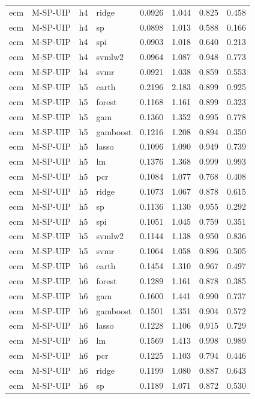 \begin{ThreePartTable}
\begin{longtable}[t]{llclcccc}
ecm & M-SP-UIP & h4 & ridge & 0.0926 & 1.044 & 0.825 & 0.458\\
ecm & M-SP-UIP & h4 & sp & 0.0898 & 1.013 & 0.588 & 0.166\\
ecm & M-SP-UIP & h4 & spi & 0.0903 & 1.018 & 0.640 & 0.213\\
ecm & M-SP-UIP & h4 & svmlw2 & 0.0964 & 1.087 & 0.948 & 0.773\\
ecm & M-SP-UIP & h4 & svmr & 0.0921 & 1.038 & 0.859 & 0.553\\
\addlinespace
ecm & M-SP-UIP & h5 & earth & 0.2196 & 2.183 & 0.899 & 0.925\\
ecm & M-SP-UIP & h5 & forest & 0.1168 & 1.161 & 0.899 & 0.323\\
ecm & M-SP-UIP & h5 & gam & 0.1360 & 1.352 & 0.995 & 0.778\\
ecm & M-SP-UIP & h5 & gamboost & 0.1216 & 1.208 & 0.894 & 0.350\\
ecm & M-SP-UIP & h5 & lasso & 0.1096 & 1.090 & 0.949 & 0.739\\
ecm & M-SP-UIP & h5 & lm & 0.1376 & 1.368 & 0.999 & 0.993\\
ecm & M-SP-UIP & h5 & pcr & 0.1084 & 1.077 & 0.768 & 0.408\\
ecm & M-SP-UIP & h5 & ridge & 0.1073 & 1.067 & 0.878 & 0.615\\
ecm & M-SP-UIP & h5 & sp & 0.1136 & 1.130 & 0.955 & 0.292\\
ecm & M-SP-UIP & h5 & spi & 0.1051 & 1.045 & 0.759 & 0.351\\
ecm & M-SP-UIP & h5 & svmlw2 & 0.1144 & 1.138 & 0.950 & 0.836\\
ecm & M-SP-UIP & h5 & svmr & 0.1064 & 1.058 & 0.896 & 0.505\\
\addlinespace
ecm & M-SP-UIP & h6 & earth & 0.1454 & 1.310 & 0.967 & 0.497\\
ecm & M-SP-UIP & h6 & forest & 0.1289 & 1.161 & 0.878 & 0.385\\
ecm & M-SP-UIP & h6 & gam & 0.1600 & 1.441 & 0.990 & 0.737\\
ecm & M-SP-UIP & h6 & gamboost & 0.1501 & 1.351 & 0.904 & 0.572\\
ecm & M-SP-UIP & h6 & lasso & 0.1228 & 1.106 & 0.915 & 0.729\\
ecm & M-SP-UIP & h6 & lm & 0.1569 & 1.413 & 0.998 & 0.989\\
ecm & M-SP-UIP & h6 & pcr & 0.1225 & 1.103 & 0.794 & 0.446\\
ecm & M-SP-UIP & h6 & ridge & 0.1199 & 1.080 & 0.887 & 0.643\\
ecm & M-SP-UIP & h6 & sp & 0.1189 & 1.071 & 0.872 & 0.530\\

\end{longtable}
\end{ThreePartTable}
